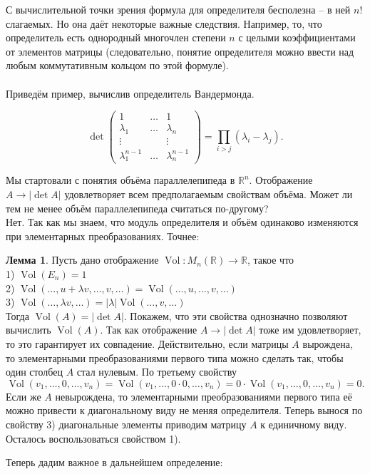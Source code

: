 \documentclass[10pt,a4paper,oneside]{book} %
\theoremstyle{definition}
\newtheorem{lem}{Лемма}
\newcommand{\mb}[1]{\mathbb{#1}}
\newcommand{\Vol}{\operatorname{Vol}}
\def\exm{\noindent {\bf Примеры:}}
\def\lm{\begin{lem}}
\def\elm{\end{lem}}
\def\pmat{\begin{pmatrix}}
\def\epmat{\end{pmatrix}}
\begin{document}
С вычислительной точки зрения формула для определителя бесполезна -- в ней $n!$ слагаемых. Но она даёт некоторые важные следствия. Например, то, что определитель есть однородный многочлен степени $n$ с целыми коэффициентами от элементов матрицы (следовательно, понятие определителя можно ввести над любым коммутативным кольцом по этой формуле).\\


\exm\\
Приведём пример, вычислив определитель Вандермонда.

$$\det \pmat 1 & \dots & 1\\
\lambda_1 & \dots & \lambda_n\\
\vdots &&\vdots\\
\lambda_1^{n-1}& \dots & \lambda_n^{n-1} \epmat= \prod_{i>j}(\lambda_i-\lambda_j).$$


Мы стартовали с понятия объёма параллелепипеда в $\mb R^n$. Отображение $A \to |\det A|$ удовлетворяет всем предполагаемым свойствам объёма. Может ли тем не менее объём параллелепипеда считаться по-другому? \\
Нет. Так как мы знаем, что модуль определителя и объём одинаково изменяются при элементарных преобразованиях. Точнее:

\lm Пусть дано отображение $\Vol \colon M_n(\mb R) \to \mb R $, такое что \\
1) $\Vol(E_n)=1$\\
2) $\Vol(\dots,u+\lambda v,\dots,v,\dots)=\Vol(\dots,u,\dots,v,\dots)$\\
3) $\Vol(\dots,\lambda v,\dots)=|\lambda|\Vol(\dots,v,\dots)$\\
Тогда $\Vol(A)=|\det A|$.
\proof Покажем, что эти свойства однозначно позволяют вычислить $\Vol(A)$. Так как отображение $A\to |\det A|$ тоже им удовлетворяет, то это гарантирует их совпадение.  Действительно, если матрицы $A$ вырождена, то элементарными преобразованиями первого типа можно сделать так, чтобы один столбец $A$ стал нулевым. По третьему свойству $$\Vol(v_1,\dots,0,\dots,v_n)=\Vol(v_1,\dots,0\cdot 0,\dots,v_n)=0\cdot\Vol(v_1,\dots,0,\dots,v_n)=0.$$
Если же $A$ невырождена, то элементарными преобразованиями первого типа её можно привести к диагональному виду не меняя определителя. Теперь вынося по свойству 3) диагональные элементы приводим матрицу $A$ к единичному виду. Осталось воспользоваться свойством 1).
\endproof
\elm




Теперь дадим важное в дальнейшем определение:
\end{document}
